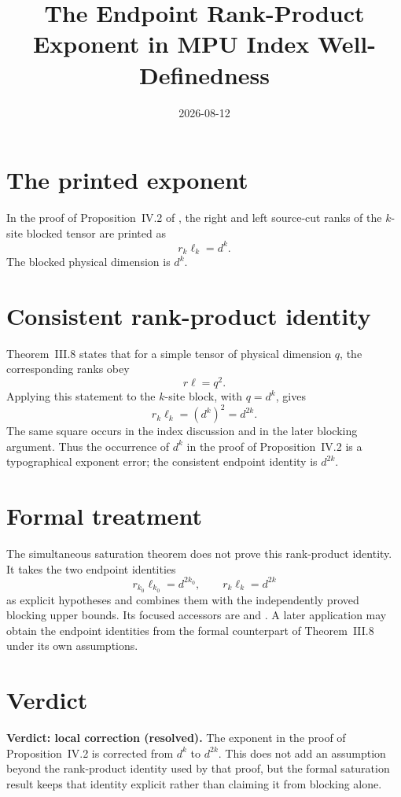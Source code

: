 \documentclass{article}
\title{The Endpoint Rank-Product Exponent in MPU Index Well-Definedness}
\author{}
\date{2026-08-12}
\begin{document}
\maketitle

\section{The printed exponent}

In the proof of Proposition~IV.2 of \cite{Cirac2017MPU}, the right and left
source-cut ranks of the $k$-site blocked tensor are printed as
\[
  r_k\ell_k=d^k.
\]
The blocked physical dimension is $d^k$.

\section{Consistent rank-product identity}

Theorem~III.8 states that for a simple tensor of physical dimension $q$, the
corresponding ranks obey
\[
  r\ell=q^2.
\]
Applying this statement to the $k$-site block, with $q=d^k$, gives
\[
  r_k\ell_k=(d^k)^2=d^{2k}.
\]
The same square occurs in the index discussion and in the later blocking
argument. Thus the occurrence of $d^k$ in the proof of Proposition~IV.2 is a
typographical exponent error; the consistent endpoint identity is $d^{2k}$.

\section{Formal treatment}

The simultaneous saturation theorem
 does not prove this
rank-product identity. It takes the two endpoint identities
\[
  r_{k_0}\ell_{k_0}=d^{2k_0},
  \qquad
  r_k\ell_k=d^{2k}
\]
as explicit hypotheses and combines them with the independently proved
blocking upper bounds. Its focused accessors are
 and
. A later
application may obtain the endpoint identities from the formal counterpart of
Theorem~III.8 under its own assumptions.

\section{Verdict}

\textbf{Verdict: local correction (resolved).}  The exponent in the proof of
Proposition~IV.2 is corrected from $d^k$ to $d^{2k}$. This does not add an
assumption beyond the rank-product identity used by that proof, but the formal
saturation result keeps that identity explicit rather than claiming it from
blocking alone.



\end{document}
